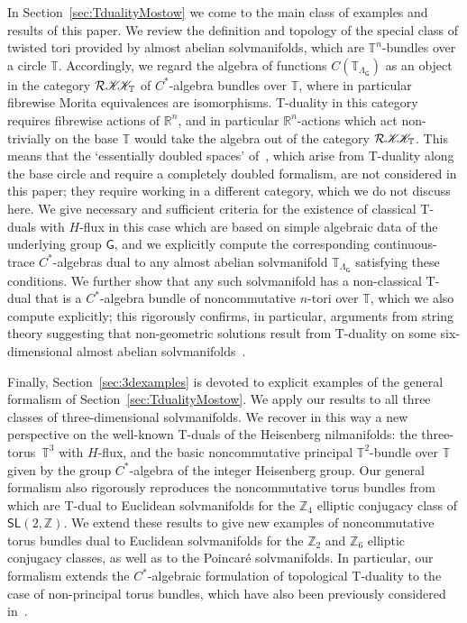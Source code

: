 \documentclass[10pt,a4paper]{amsart}
\numberwithin{equation}{section}
\newcommand{\Z}{\zed}
\newcommand{\CCK}{\mathscr{K}}
\newcommand{\sfG}{\mathsf{G}}
\newcommand{\sfSL}{\mathsf{SL}}
\newcommand{\R}{\real}
\newcommand{\zed}{{\mathbb Z}} %
\newcommand{\real}{{\mathbb R}} %
\newcommand{\torus}{{\mathbb T}} %
\begin{document}
In Section~\ref{sec:TdualityMostow} we come to the main class of
examples and results of this paper. We review the definition and
topology of the special class of twisted tori provided by almost
abelian solvmanifolds, which are $\torus^n$-bundles over a circle
$\torus$. Accordingly, we regard the algebra of functions
$C(\torus_{\Lambda_\sfG})$ as an object in the category
$\mathcal{R}\CCK\hspace{-1mm}\CCK_\torus$ of $C^*$-algebra bundles
over $\torus$, where in particular fibrewise Morita equivalences are
isomorphisms. T-duality in this category requires fibrewise actions of
$\R^n$, and in particular $\R^n$-actions which act non-trivially on
the base $\torus$ would take the algebra out of the category
$\mathcal{R}\CCK\hspace{-1mm}\CCK_\torus$. This means that the `essentially
doubled spaces' of~\cite{Hull2019}, which arise from T-duality along
the base circle and require a completely doubled formalism, are not
considered in this paper; they require working in a different
category, which we do not discuss here. We give necessary and
sufficient criteria for the existence of classical T-duals with
$H$-flux in this case which are based on simple algebraic data of the
underlying group $\sfG$, and we explicitly compute the corresponding
continuous-trace $C^*$-algebras dual to any almost abelian
solvmanifold $\torus_{\Lambda_\sfG}$ satisfying these conditions. We
 further show that any such solvmanifold has a non-classical T-dual
 that is a $C^*$-algebra bundle of noncommutative $n$-tori over
 $\torus$, which we also compute explicitly; this rigorously
 confirms, in particular, arguments from string theory suggesting that non-geometric
 solutions result from T-duality on some six-dimensional almost
 abelian solvmanifolds~\cite{Andriot:2015sia}.

Finally, Section~\ref{sec:3dexamples} is devoted to explicit examples
of the general formalism of Section~\ref{sec:TdualityMostow}. We apply
our results to all three classes of three-dimensional
solvmanifolds. We recover in this way a new perspective on the
well-known T-duals of the Heisenberg nilmanifolds: the three-torus~$\torus^3$ with $H$-flux, and the basic noncommutative principal
$\torus^2$-bundle over $\torus$ given by the group $C^*$-algebra of the integer
Heisenberg group. Our general formalism also rigorously reproduces
the noncommutative torus bundles from~\cite{Hull2019} which are T-dual
to Euclidean solvmanifolds for the $\Z_4$ elliptic conjugacy class of
$\sfSL(2,\Z)$. We extend these results to give new examples of
noncommutative torus bundles dual to Euclidean solvmanifolds for the
$\Z_2$ and $\Z_6$ elliptic conjugacy classes, as well as to the
Poincar\'e solvmanifolds. In particular, our formalism extends the
$C^*$-algebraic formulation of topological T-duality to the case of
non-principal torus bundles, which have also been previously
considered in~\cite{Hannabuss2011}.
\end{document}
